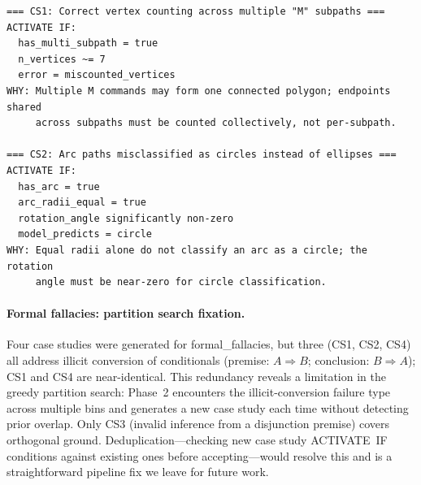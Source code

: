 \documentclass{article}
\begin{document}
\begin{lstlisting}[caption={Phase-2 case studies generated for geometric\_shapes (v3). ACTIVATE
  IF conditions encode structural SVG parsing rules intended to generalise across model families
  (narrow predicates such as \texttt{n\_vertices}$\approx$7 limit scope):
  under Gemini training, these rules benefit GPT-4.1 ($+4.0$\,pp) and Gemini ($+5.0$\,pp).},
  label={lst:gs_cs}]
=== CS1: Correct vertex counting across multiple "M" subpaths ===
ACTIVATE IF:
  has_multi_subpath = true
  n_vertices ~= 7
  error = miscounted_vertices
WHY: Multiple M commands may form one connected polygon; endpoints shared
     across subpaths must be counted collectively, not per-subpath.

=== CS2: Arc paths misclassified as circles instead of ellipses ===
ACTIVATE IF:
  has_arc = true
  arc_radii_equal = true
  rotation_angle significantly non-zero
  model_predicts = circle
WHY: Equal radii alone do not classify an arc as a circle; the rotation
     angle must be near-zero for circle classification.
\end{lstlisting}

\paragraph{Formal fallacies: partition search fixation.}
Four case studies were generated for formal\_fallacies, but three (CS1, CS2, CS4) all address
illicit conversion of conditionals (premise: $A\!\Rightarrow\!B$; conclusion:
$B\!\Rightarrow\!A$); CS1 and CS4 are near-identical.
This redundancy reveals a limitation in the greedy partition search: Phase~2 encounters the
illicit-conversion failure type across multiple bins and generates a new case study each time
without detecting prior overlap.
Only CS3 (invalid inference from a disjunction premise) covers orthogonal ground.
Deduplication---checking new case study ACTIVATE~IF conditions against existing ones before
accepting---would resolve this and is a straightforward pipeline fix we leave for future work.
\end{document}

